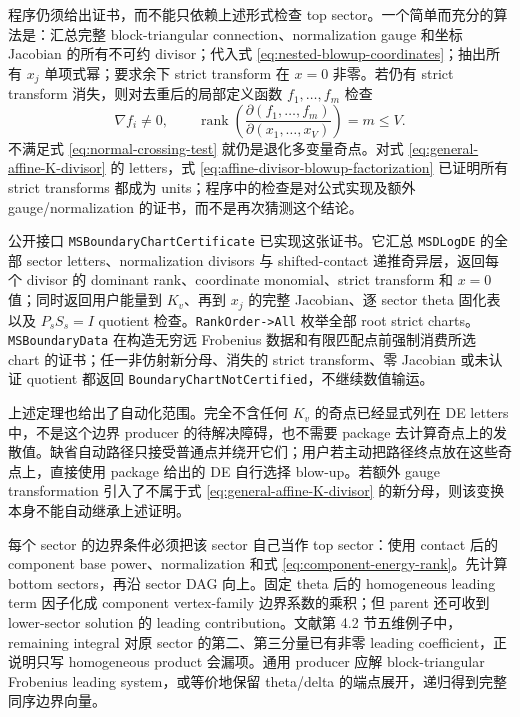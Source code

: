 \documentclass[11pt,a4paper]{ctexart}
\begin{document}
程序仍须给出证书，而不能只依赖上述形式检查 top sector。一个简单而充分的算法是：汇总完整 block-triangular connection、normalization gauge 和坐标 Jacobian 的所有不可约 divisor；代入式 \eqref{eq:nested-blowup-coordinates}；抽出所有 $x_j$ 单项式幂；要求余下 strict transform 在 $x=0$ 非零。若仍有 strict transform 消失，则对去重后的局部定义函数 $f_1,\ldots,f_m$ 检查
\begin{equation}
 \nabla f_i\neq0,
 \qquad
 \operatorname{rank}\!\left(\frac{\partial(f_1,\ldots,f_m)}
 {\partial(x_1,\ldots,x_V)}\right)=m\leq V.
 \label{eq:normal-crossing-test}
\end{equation}
不满足式 \eqref{eq:normal-crossing-test} 就仍是退化多变量奇点。对式 \eqref{eq:general-affine-K-divisor} 的 letters，式 \eqref{eq:affine-divisor-blowup-factorization} 已证明所有 strict transforms 都成为 units；程序中的检查是对公式实现及额外 gauge/normalization 的证书，而不是再次猜测这个结论。

公开接口 \texttt{MSBoundaryChartCertificate} 已实现这张证书。它汇总 \texttt{MSDLogDE} 的全部 sector letters、normalization divisors 与 shifted-contact 递推奇异层，返回每个 divisor 的 dominant rank、coordinate monomial、strict transform 和 $x=0$ 值；同时返回用户能量到 $K_v$、再到 $x_j$ 的完整 Jacobian、逐 sector theta 固化表以及 $P_sS_s=I$ quotient 检查。\texttt{RankOrder->All} 枚举全部 root strict charts。\texttt{MSBoundaryData} 在构造无穷远 Frobenius 数据和有限匹配点前强制消费所选 chart 的证书；任一非仿射新分母、消失的 strict transform、零 Jacobian 或未认证 quotient 都返回 \texttt{BoundaryChartNotCertified}，不继续数值输运。

上述定理也给出了自动化范围。完全不含任何 $K_v$ 的奇点已经显式列在 DE letters 中，不是这个边界 producer 的待解决障碍，也不需要 package 去计算奇点上的发散值。缺省自动路径只接受普通点并绕开它们；用户若主动把路径终点放在这些奇点上，直接使用 package 给出的 DE 自行选择 blow-up。若额外 gauge transformation 引入了不属于式 \eqref{eq:general-affine-K-divisor} 的新分母，则该变换本身不能自动继承上述证明。

每个 sector 的边界条件必须把该 sector 自己当作 top sector：使用 contact 后的 component base power、normalization 和式 \eqref{eq:component-energy-rank}。先计算 bottom sectors，再沿 sector DAG 向上。固定 theta 后的 homogeneous leading term 因子化成 component vertex-family 边界系数的乘积；但 parent 还可收到 lower-sector solution 的 leading contribution。文献第 4.2 节五维例子中，remaining integral 对原 sector 的第二、第三分量已有非零 leading coefficient，正说明只写 homogeneous product 会漏项。通用 producer 应解 block-triangular Frobenius leading system，或等价地保留 theta/delta 的端点展开，递归得到完整同序边界向量。
\end{document}
